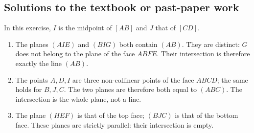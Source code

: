 \subsection{Solutions to the textbook or past-paper work}In this exercise, $I$ is the midpoint of $[AB]$ and $J$ that of $[CD]$.
\begin{enumerate}
\item The planes $(AIE)$ and $(BIG)$ both contain $(AB)$. They are distinct: $G$ does not belong to the plane of the face $ABFE$. Their intersection is therefore exactly the line $(AB)$.
\item The points $A,D,I$ are three non-collinear points of the face $ABCD$; the same holds for $B,J,C$. The two planes are therefore both equal to $(ABC)$. The intersection is the whole plane, not a line.
\item The plane $(HEF)$ is that of the top face; $(BJC)$ is that of the bottom face. These planes are strictly parallel: their intersection is empty.
\end{enumerate}

\fi

